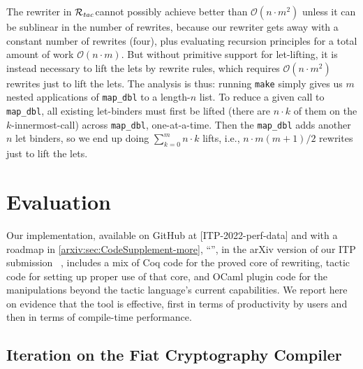\documentclass[sn-mathphys,pdflatex]{sn-jnl}%
\newcommand{\Rtac}{\ensuremath{\mathcal{R}_\text{\emph{tac}}}}
\newcommand{\arxivautonameref}[1]{\autoref*{arxiv:#1}, ``\nameref*{arxiv:#1}''}
\newcommand{\arxivautoreflong}[1]{\arxivautonameref{#1}, in the arXiv version of our ITP submission~\cite{RewritingITP2022}%
\let\arxivautoref\arxivautorefshort}
\newcommand{\arxivautorefshort}[1]{\arxivautonameref{#1}, in~\cite{RewritingITP2022}}
\let\arxivautoref\arxivautoreflong
\theoremstyle{thmstyleone}%
\theoremstyle{thmstyletwo}%
\theoremstyle{thmstylethree}%
\begin{document}
The rewriter in \Rtac\space cannot possibly achieve better than $\mathcal{O}\left(n\cdot m^2\right)$ unless it can be sublinear in the number of rewrites, because our rewriter gets away with a constant number of rewrites (four), plus evaluating recursion principles for a total amount of work $\mathcal{O}(n\cdot m)$.
But without primitive support for let-lifting, it is instead necessary to lift the lets by rewrite rules, which requires $\mathcal{O}\left(n\cdot m^2\right)$ rewrites just to lift the lets.
The analysis is thus: running \texttt{make} simply gives us $m$ nested applications of \texttt{map\_dbl} to a length-$n$ list.
To reduce a given call to \texttt{map\_dbl}, all existing let-binders must first be lifted (there are $n\cdot k$ of them on the $k$-innermost-call) across \texttt{map\_dbl}, one-at-a-time.
Then the \texttt{map\_dbl} adds another $n$ let binders, so we end up doing $\sum_{k=0}^{m} n\cdot k$ lifts, i.e., $n\cdot m(m+1)/2$ rewrites just to lift the lets.

\section{Evaluation}\label{sec:evaluation}


Our implementation, available on GitHub at [ITP-2022-perf-data] and with a roadmap in \arxivautoreflong{sec:CodeSupplement-more}, includes a mix of Coq code for the proved core of rewriting, tactic code for setting up proper use of that core, and OCaml plugin code for the manipulations beyond the tactic language's current capabilities.
We report here on evidence that the tool is effective, first in terms of productivity by users and then in terms of compile-time performance.

\subsection{Iteration on the Fiat Cryptography Compiler}\label{sec:iteration}
\end{document}
